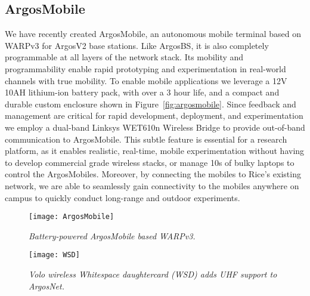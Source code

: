 
\subsection{ArgosMobile}
We have recently created ArgosMobile, an autonomous mobile terminal based on WARPv3 for ArgosV2 base stations. 
Like ArgosBS, it is also completely programmable at all layers of the network stack. 
Its mobility and programmability enable rapid prototyping and experimentation in real-world channels with true mobility. 
To enable mobile applications we leverage a 12V 10AH lithium-ion battery pack, with over a 3 hour life, and a compact and durable custom enclosure shown in Figure~\ref{fig:argosmobile}.
Since feedback and management are critical for rapid development, deployment, and experimentation we employ a dual-band Linksys WET610n Wireless Bridge to provide out-of-band communication to ArgosMobile.
 This subtle feature is essential for a research platform, as it enables realistic, real-time, mobile experimentation without having to develop commercial grade wireless stacks, or manage 10s of bulky laptops to control the ArgosMobiles.
Moreover, by connecting the mobiles to Rice's existing network, we are able to seamlessly gain connectivity to the mobiles anywhere on campus to quickly conduct long-range and outdoor experiments.


\begin{figure*}
\centering
\begin{minipage}[t][6.1cm]{0.49\textwidth}
\centering
 \texttt{[image: ArgosMobile]}
  \vspace{-2mm}
\caption{\emph{Battery-powered ArgosMobile based WARPv3.}}
\label{fig:argosmobile}
\end{minipage}
\hspace{+3mm}
\begin{minipage}[t][6cm]{0.463\textwidth}
    \centering
 \texttt{[image: WSD]}
		\vspace{-2mm}
    \caption{\it{Volo wireless Whitespace daughtercard (WSD) adds UHF support to ArgosNet.}}
    \label{fig:WSD}
\end{minipage}
\vspace{-1mm}
\end{figure*}